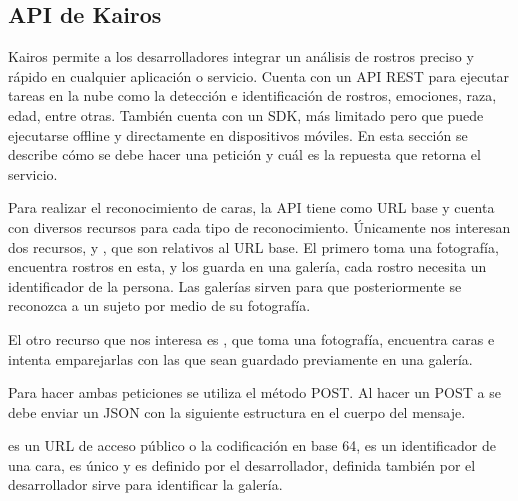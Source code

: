 \subsection{API de Kairos}
\label{\detokenize{chapter_one/apis_rest:api-de-kairos}}
Kairos permite a los desarrolladores integrar un análisis de rostros preciso
y rápido en cualquier aplicación o servicio. Cuenta con un API REST
para ejecutar tareas en la nube como la detección e identificación de rostros,
emociones, raza, edad, entre otras. También cuenta con un SDK, más limitado
pero que puede ejecutarse offline y directamente en dispositivos móviles.
En esta sección se describe cómo se debe hacer una petición
y cuál es la repuesta que retorna el servicio.

Para realizar el reconocimiento de caras, la API tiene como URL base
 y cuenta con diversos recursos para cada tipo de
reconocimiento. Únicamente nos interesan dos recursos,  y
, que son relativos al URL base.
El primero toma una fotografía, encuentra rostros en esta,
y los guarda en una galería, cada rostro necesita un identificador de la
persona. Las galerías sirven para que posteriormente se reconozca a un sujeto
por medio de su fotografía.

El otro recurso que nos interesa es , que toma una fotografía,
encuentra caras e intenta emparejarlas con las que sean guardado
previamente en una galería.

Para hacer ambas peticiones se utiliza el método POST. Al hacer un POST
a  se debe enviar un JSON con la siguiente estructura en el cuerpo
del mensaje.

\begin{sphinxVerbatim}[commandchars=\\\{\}]
   
   
   
\end{sphinxVerbatim}

 es un URL de acceso público o la codificación en base 64,  es un identificador
de una cara, es único y es definido por el desarrollador, 
definida también por el desarrollador sirve para identificar la galería.

